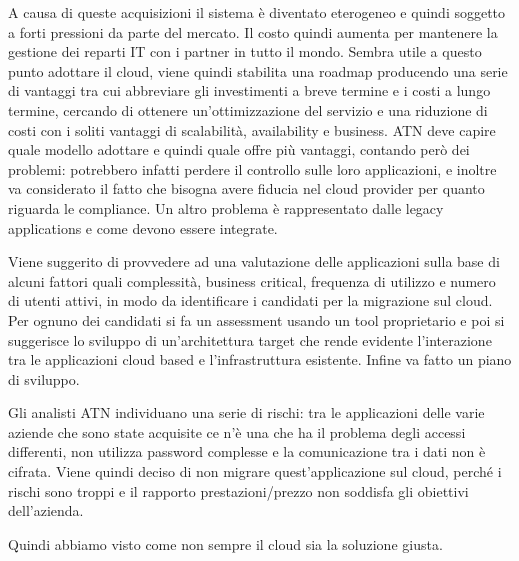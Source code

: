 A causa di queste acquisizioni il sistema è diventato eterogeneo e quindi soggetto a forti pressioni da parte del mercato. Il costo quindi aumenta per mantenere la gestione dei reparti IT con i partner in tutto il mondo. Sembra utile a questo punto adottare il cloud, viene quindi stabilita una roadmap producendo una serie di vantaggi tra cui abbreviare gli investimenti a breve termine e i costi a lungo termine, cercando di ottenere un'ottimizzazione del servizio e una riduzione di costi con i soliti vantaggi di scalabilità, availability e business. ATN deve capire quale modello adottare e quindi quale offre più vantaggi, contando però dei problemi: potrebbero infatti perdere il controllo sulle loro applicazioni, e inoltre va considerato il fatto che bisogna avere fiducia nel cloud provider per quanto riguarda le compliance. Un altro problema è rappresentato dalle legacy applications e come devono essere integrate.

\vspace{5mm}

Viene suggerito di provvedere ad una valutazione delle applicazioni sulla base di alcuni fattori quali complessità, business critical, frequenza di utilizzo e numero di utenti attivi, in modo da identificare i candidati per la migrazione sul cloud. Per ognuno dei candidati si fa un assessment usando un tool proprietario e poi si suggerisce lo sviluppo di un'architettura target che rende evidente l'interazione tra le applicazioni cloud based e l'infrastruttura esistente. Infine va fatto un piano di sviluppo.

Gli analisti ATN individuano una serie di rischi: tra le applicazioni delle varie aziende che sono state acquisite ce n'è una che ha il problema degli accessi differenti, non utilizza password complesse e la comunicazione tra i dati non è cifrata. Viene quindi deciso di non migrare quest'applicazione sul cloud, perché i rischi sono troppi e il rapporto prestazioni/prezzo non soddisfa gli obiettivi dell'azienda.

Quindi abbiamo visto come non sempre il cloud sia la soluzione giusta.

